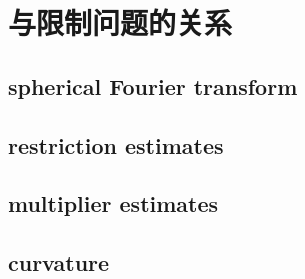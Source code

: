 \section{与限制问题的关系}
\label{b2:sec:2404}


\subsection{spherical Fourier transform}
\label{b2:subsec:240401}

\subsection{restriction estimates}
\label{b2:subsec:240402}

\subsection{multiplier estimates}
\label{b2:subsec:240403}

\subsection{curvature}
\label{b2:subsec:240404}


